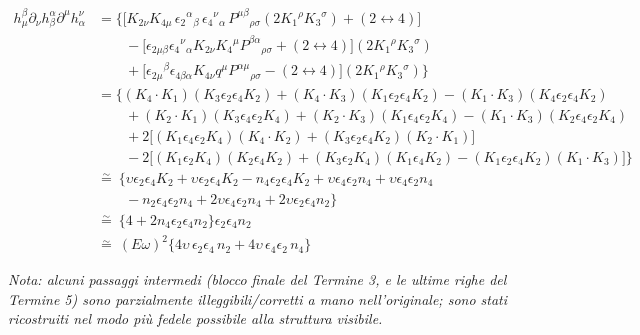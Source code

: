 \documentclass[11pt]{article}
\begin{document}
\begin{align*}
h_\mu^\beta\partial_\nu h_\beta^\alpha\partial^\mu h_\alpha^\nu
&= \Big\{\big[K_{2\nu}K_{4\mu}\,\epsilon_2{}^\alpha{}_\beta\,\epsilon_4{}^\nu{}_\alpha\,P^{\mu\beta}{}_{\rho\sigma}(2K_1{}^\rho K_3{}^\sigma)+(2\leftrightarrow4)\big] \\
&\qquad -\big[\epsilon_{2\mu\beta}\epsilon_4{}^\nu{}_\alpha K_{2\nu}K_4{}^\mu P^{\beta\alpha}{}_{\rho\sigma}+(2\leftrightarrow4)\big](2K_1{}^\rho K_3{}^\sigma) \\
&\qquad +\big[\epsilon_{2\mu}{}^\beta\epsilon_{4\beta\alpha}K_{4\nu}q^\mu P^{\alpha\mu}{}_{\rho\sigma}-(2\leftrightarrow4)\big](2K_1{}^\rho K_3{}^\sigma)\Big\} \\[4pt]
&= \Big\{(K_4\!\cdot\!K_1)(K_3\epsilon_2\epsilon_4K_2)+(K_4\!\cdot\!K_3)(K_1\epsilon_2\epsilon_4K_2)-(K_1\!\cdot\!K_3)(K_4\epsilon_2\epsilon_4K_2) \\
&\qquad +(K_2\!\cdot\!K_1)(K_3\epsilon_4\epsilon_2K_4)+(K_2\!\cdot\!K_3)(K_1\epsilon_4\epsilon_2K_4)-(K_1\!\cdot\!K_3)(K_2\epsilon_4\epsilon_2K_4) \\
&\qquad +2\big[(K_1\epsilon_4\epsilon_2K_4)(K_4\!\cdot\!K_2)+(K_3\epsilon_2\epsilon_4K_2)(K_2\!\cdot\!K_1)\big] \\
&\qquad -2\big[(K_1\epsilon_2K_4)(K_2\epsilon_4K_2)+(K_3\epsilon_2K_4)(K_1\epsilon_4K_2)-(K_1\epsilon_2\epsilon_4K_2)(K_1\!\cdot\!K_3)\big]\Big\} \\[4pt]
&\overset{\sim}{=}\ \Big\{\upsilon\epsilon_2\epsilon_4K_2+\upsilon\epsilon_2\epsilon_4K_2-n_4\epsilon_2\epsilon_4K_2+\upsilon\epsilon_4\epsilon_2n_4+\upsilon\epsilon_4\epsilon_2n_4 \\
&\qquad -n_2\epsilon_4\epsilon_2n_4+2\upsilon\epsilon_4\epsilon_2n_4+2\upsilon\epsilon_2\epsilon_4n_2\Big\} \\[4pt]
&\overset{\sim}{=}\ \big\{4+2n_4\epsilon_2\epsilon_4n_2\big\}\epsilon_2\epsilon_4n_2 \\[4pt]
&\overset{\sim}{=}\ (E\omega)^2\big\{4\upsilon\,\epsilon_2\epsilon_4\,n_2+4\upsilon\,\epsilon_4\epsilon_2\,n_4\big\}
\end{align*}

\bigskip
\noindent\footnotesize\emph{Nota: alcuni passaggi intermedi (blocco finale del Termine 3, e le ultime righe del Termine 5) sono parzialmente illeggibili/corretti a mano nell'originale; sono stati ricostruiti nel modo più fedele possibile alla struttura visibile.}
\end{document}
